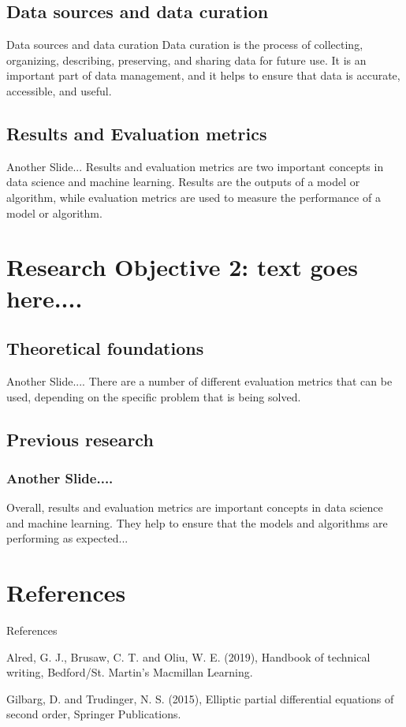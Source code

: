\documentclass{beamer}
\begin{document}
\subsection{Data sources and data curation}
\begin{frame}{Data sources and data curation}
Data curation is the process of collecting, organizing, describing, preserving, and sharing data for future use. It is an important part of data management, and it helps to ensure that data is accurate, accessible, and useful.
\end{frame}

\subsection{Results and Evaluation metrics}
\begin{frame}{Another Slide...}
Results and evaluation metrics are two important concepts in data science and machine learning. Results are the outputs of a model or algorithm, while evaluation metrics are used to measure the performance of a model or algorithm.	
\end{frame}
\section{Research Objective 2: text goes here....}
\subsection{Theoretical foundations}
\begin{frame}{Another Slide....}
	There are a number of different evaluation metrics that can be used, depending on the specific problem that is being solved.
\end{frame}
\subsection{Previous research}
\begin{frame}
	\frametitle{Another Slide....}
Overall, results and evaluation metrics are important concepts in data science and machine learning. They help to ensure that the models and algorithms are performing as expected...
\end{frame}
\section*{References}

\begin{frame}{References}
	
	\begin{thebibliography}{9}
		Alred, G. J., Brusaw, C. T. and Oliu, W. E. (2019), Handbook of technical writing, Bedford/St.	Martin’s Macmillan Learning. 
		
		Gilbarg, D. and Trudinger, N. S. (2015), Elliptic partial differential equations of second order,
		Springer Publications.
		
		
		
	\end{thebibliography}
\end{frame}
\end{document}
